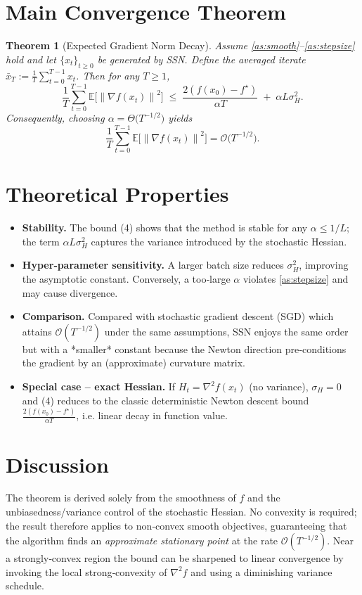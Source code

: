 \documentclass{article}
\newtheorem{theorem}{Theorem}
\newcommand{\E}{\mathbb{E}}
\newcommand{\norm}[1]{\left\|#1\right\|}
\newcommand{\grad}{\nabla}
\begin{document}
\section*{Main Convergence Theorem}
\begin{theorem}[Expected Gradient Norm Decay]\label{thm:main}
Assume \ref{as:smooth}–\ref{as:stepsize} hold and let $\{x_t\}_{t\ge0}$ be generated by SSN.
Define the averaged iterate $\bar x_T:=\frac{1}{T}\sum_{t=0}^{T-1}x_t$.
Then for any $T\ge 1$,
\[
\frac{1}{T}\sum_{t=0}^{T-1}\E\!\big[\norm{\grad f(x_t)}^2\big]
\;\le\;
\frac{2(f(x_0)-f^\star)}{\alpha T}
\;+\;
\alpha L \sigma_H^2 .
\tag{4}
\]
Consequently, choosing $\alpha = \Theta\!\big(T^{-1/2}\big)$ yields
\[
\frac{1}{T}\sum_{t=0}^{T-1}\E\!\big[\norm{\grad f(x_t)}^2\big]=\mathcal O\!\big(T^{-1/2}\big).
\]
\end{theorem}

\section*{Theoretical Properties}
\begin{itemize}
\item \textbf{Stability.} The bound (4) shows that the method is stable for any $\alpha\le1/L$; the term $\alpha L\sigma_H^2$ captures the variance introduced by the stochastic Hessian.
\item \textbf{Hyper‑parameter sensitivity.} A larger batch size reduces $\sigma_H^2$, improving the asymptotic constant. Conversely, a too‑large $\alpha$ violates \ref{as:stepsize} and may cause divergence.
\item \textbf{Comparison.} Compared with stochastic gradient descent (SGD) which attains $\mathcal O(T^{-1/2})$ under the same assumptions, SSN enjoys the same order but with a *smaller* constant because the Newton direction pre‑conditions the gradient by an (approximate) curvature matrix.
\item \textbf{Special case – exact Hessian.} If $H_t=\nabla^2 f(x_t)$ (no variance), $\sigma_H=0$ and (4) reduces to the classic deterministic Newton descent bound $\frac{2(f(x_0)-f^\star)}{\alpha T}$, i.e. linear decay in function value.
\end{itemize}

\section*{Discussion}
The theorem is derived solely from the smoothness of $f$ and the unbiasedness/variance control of the stochastic Hessian.  No convexity is required; the result therefore applies to non‑convex smooth objectives, guaranteeing that the algorithm finds an \emph{approximate stationary point} at the rate $\mathcal O(T^{-1/2})$.  Near a strongly‑convex region the bound can be sharpened to linear convergence by invoking the local strong‑convexity of $\nabla^2 f$ and using a diminishing variance schedule.
\end{document}
